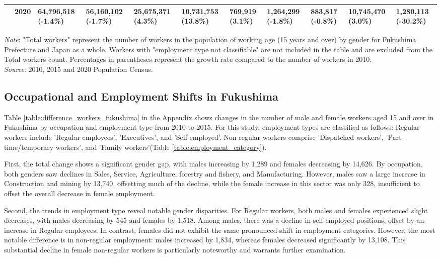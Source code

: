 \documentclass[a4paper,12pt]{article}
\begin{document}
\begin{table}[htbp]
{\begin{tabular}{lllllllllll}
 & 2020 & 64,796,518 (-1.4\%) & 56,160,102 (-1.7\%) & \multicolumn{1}{l}{25,675,371 (4.3\%)} & \multicolumn{1}{l}{10,731,753 (13.8\%)} & \multicolumn{1}{l}{769,919 (3.1\%)} & \multicolumn{1}{l}{1,264,299 (-1.8\%)} & \multicolumn{1}{l}{883,817 (-0.8\%)} & \multicolumn{1}{l}{10,745,470 (3.0\%)} & \multicolumn{1}{l}{1,280,113 (-30.2\%)} \\
\hline
\end{tabular}%
}
\addlinespace[0.12em]
\raggedright
\scriptsize
\textit{Note}: "Total workers" represent the number of workers in the population of working age (15 years and over) by gender for Fukushima Prefecture and Japan as a whole. Workers with "employment type not classifiable" are not included in the table and are excluded from the Total workers count. Percentages in parentheses represent the growth rate compared to the number of workers in 2010.\\
\textit{Source}: 2010, 2015 and 2020 Population Census.\\
\label{table:Number_of_workers}
\end{table}


\subsection{Occupational and Employment Shifts in Fukushima}

Table \ref{table:difference_workers_fukushima} in the Appendix shows changes in the number of male and female workers aged 15 and over in Fukushima by occupation and employment type from 2010 to 2015. For this study, employment types are classified as follows: Regular workers include 'Regular employees', 'Executives', and 'Self-employed'. Non-regular workers comprise 'Dispatched workers', 'Part-time/temporary workers', and 'Family workers'(Table \ref{table:employment_category}).

First, the total change shows a significant gender gap, with males increasing by 1,289 and females decreasing by 14,626. By occupation, both genders saw declines in Sales, Service, Agriculture, forestry and fishery, and Manufacturing. However, males saw a large increase in Construction and mining by 13,740, offsetting much of the decline, while the female increase in this sector was only 328, insufficient to offset the overall decrease in female employment.

Second, the trends in employment type reveal notable gender disparities. For Regular workers, both males and females experienced slight decreases, with males decreasing by 545 and females by 1,518. Among males, there was a decline in self-employed positions, offset by an increase in Regular employees. In contrast, females did not exhibit the same pronounced shift in employment categories. However, the most notable difference is in non-regular employment: males increased by 1,834, whereas females decreased significantly by 13,108. This substantial decline in female non-regular workers is particularly noteworthy and warrants further examination.
\end{document}
